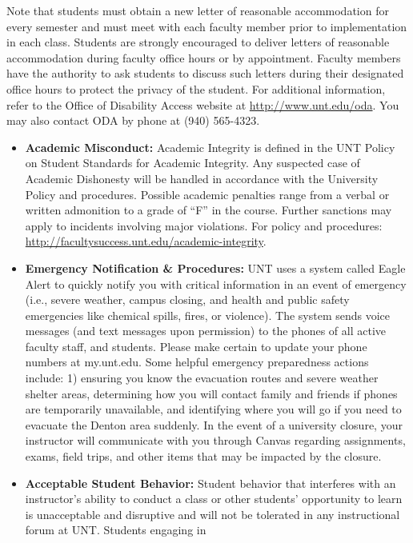 \documentclass[12pt,]{article}
\begin{document}
Note that students must obtain a new letter of reasonable accommodation
for every semester and must meet with each faculty member prior to
implementation in each class. Students are strongly encouraged to
deliver letters of reasonable accommodation during faculty office hours
or by appointment. Faculty members have the authority to ask students to
discuss such letters during their designated office hours to protect the
privacy of the student. For additional information, refer to the Office
of Disability Access website at \url{http://www.unt.edu/oda}. You may
also contact ODA by phone at (940) 565-4323.

\begin{itemize}
\item
  \textbf{Academic Misconduct:} Academic Integrity is defined in the UNT
  Policy on Student Standards for Academic Integrity. Any suspected case
  of Academic Dishonesty will be handled in accordance with the
  University Policy and procedures. Possible academic penalties range
  from a verbal or written admonition to a grade of ``F'' in the course.
  Further sanctions may apply to incidents involving major violations.
  For policy and procedures:
  \url{http://facultysuccess.unt.edu/academic-integrity}.
\item
  \textbf{Emergency Notification \& Procedures:} UNT uses a system
  called Eagle Alert to quickly notify you with critical information in
  an event of emergency (i.e., severe weather, campus closing, and
  health and public safety emergencies like chemical spills, fires, or
  violence). The system sends voice messages (and text messages upon
  permission) to the phones of all active faculty staff, and students.
  Please make certain to update your phone numbers at my.unt.edu. Some
  helpful emergency preparedness actions include: 1) ensuring you know
  the evacuation routes and severe weather shelter areas, determining
  how you will contact family and friends if phones are temporarily
  unavailable, and identifying where you will go if you need to evacuate
  the Denton area suddenly. In the event of a university closure, your
  instructor will communicate with you through Canvas regarding
  assignments, exams, field trips, and other items that may be impacted
  by the closure.
\item
  \textbf{Acceptable Student Behavior:} Student behavior that interferes
  with an instructor's ability to conduct a class or other students'
  opportunity to learn is unacceptable and disruptive and will not be
  tolerated in any instructional forum at UNT. Students engaging in

\end{itemize}
\end{document}
